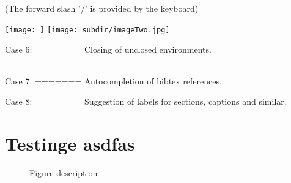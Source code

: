 (The forward slash '/' is provided by the keyboard)

\texttt{[image: ]}
\texttt{[image: subdir/imageTwo.jpg]}









Case 6: 
=======
Closing of unclosed environments.


\begin{table}
\begin{tabular}{cc}

\end{tabular}
\end{table}






Case 7:
=======
Autocompletion of bibtex references.

\cite{An}



Case 8: 
=======
Suggestion of labels for sections, captions and similar.

\section{Testinge asdfas}


\begin{figure}
\caption{Figure description}
\end{figure}





